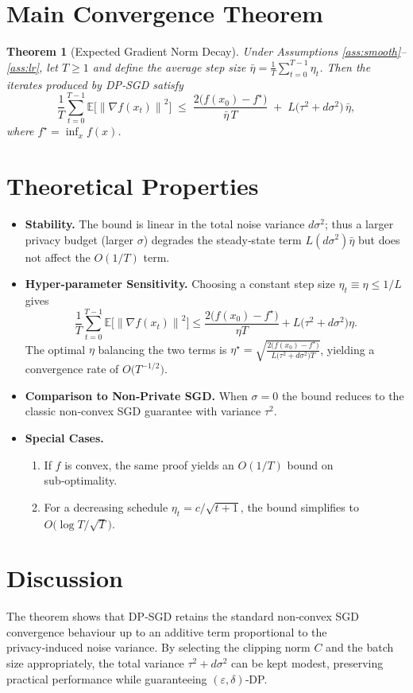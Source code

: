 \documentclass{article}
\newtheorem{theorem}{Theorem}
\newcommand{\E}{\mathbb{E}}
\newcommand{\norm}[1]{\left\|#1\right\|}
\begin{document}
\section*{Main Convergence Theorem}
\begin{theorem}[Expected Gradient Norm Decay]\label{thm:main}
Under Assumptions \ref{ass:smooth}–\ref{ass:lr}, let $T\ge1$ and define the
average step size $\bar\eta=\frac{1}{T}\sum_{t=0}^{T-1}\eta_{t}$.
Then the iterates produced by DP‑SGD satisfy
\[
\frac{1}{T}\sum_{t=0}^{T-1}\E\!\big[\norm{\nabla f(x_{t})}^{2}\big]
\;\le\;
\frac{2\big(f(x_{0})-f^{\star}\big)}{\bar\eta\,T}
\;+\;
L\Big(\tau^{2}+d\sigma^{2}\Big)\,\bar\eta,
\]
where $f^{\star}=\inf_{x}f(x)$.
\end{theorem}

\section*{Theoretical Properties}
\begin{itemize}[leftmargin=*]
\item \textbf{Stability.} The bound is linear in the total noise variance
$d\sigma^{2}$; thus a larger privacy budget (larger $\sigma$) degrades the
steady‑state term $L(d\sigma^{2})\bar\eta$ but does not affect the
$O(1/T)$ term.
\item \textbf{Hyper‑parameter Sensitivity.}
Choosing a constant step size $\eta_{t}\equiv\eta\le 1/L$ gives
\[
\frac{1}{T}\sum_{t=0}^{T-1}\E\!\big[\norm{\nabla f(x_{t})}^{2}\big]
\le
\frac{2\big(f(x_{0})-f^{\star}\big)}{\eta T}
+L\big(\tau^{2}+d\sigma^{2}\big)\eta.
\]
The optimal $\eta$ balancing the two terms is
$\eta^{\star}= \sqrt{\frac{2\big(f(x_{0})-f^{\star}\big)}{L\big(\tau^{2}+d\sigma^{2}\big)T}}$,
yielding a convergence rate of $O\!\big(T^{-1/2}\big)$.
\item \textbf{Comparison to Non‑Private SGD.}
When $\sigma=0$ the bound reduces to the classic non‑convex SGD guarantee
with variance $\tau^{2}$.
\item \textbf{Special Cases.}
\begin{enumerate}
\item If $f$ is convex, the same proof yields an $O(1/T)$ bound on sub‑optimality.
\item For a decreasing schedule $\eta_{t}=c/\sqrt{t+1}$, the bound simplifies to
$O\!\big(\log T/\sqrt{T}\big)$.
\end{enumerate}
\end{itemize}

\section*{Discussion}
The theorem shows that DP‑SGD retains the standard non‑convex SGD convergence
behaviour up to an additive term proportional to the privacy‑induced noise
variance. By selecting the clipping norm $C$ and the batch size appropriately,
the total variance $\tau^{2}+d\sigma^{2}$ can be kept modest, preserving
practical performance while guaranteeing $(\varepsilon,\delta)$‑DP.
\end{document}
